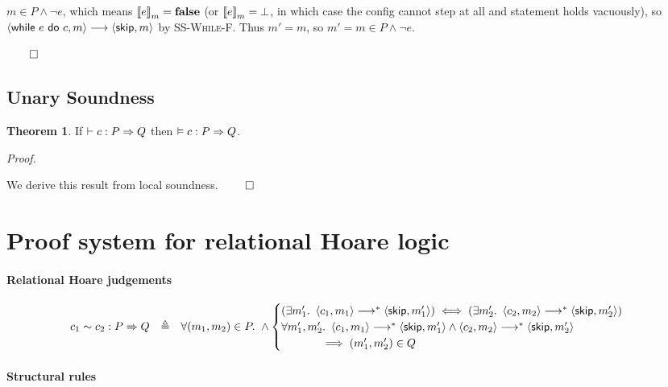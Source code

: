 \documentclass[10pt]{article}
\theoremstyle{definition}
\newtheorem{theorem}{Theorem}
\begin{document}
$m \in P \wedge \neg e$, which means $\Eval(e,m) = \False$
(or $\Eval(e,m) = \bot$, in which case the config cannot step at all and statement holds vacuously),
so $\Cfg(\While e do c,m) \sstepsto \Cfg(\Skip,m)$ by \textsc{SS-While-F}.
Thus $m' = m$, so $m' = m \in P \wedge \neg e$.


\hfill $\qed$

\subsection*{Unary Soundness}
\begin{theorem}
If $\DER \Triple c : P => Q$ then $\VAL \Triple c : P => Q$.
\end{theorem}

\noindent
\emph{Proof.}

\noindent
We derive this result from local soundness.
\hfill $\qed$


\newpage
\section{Proof system for relational Hoare logic}

\paragraph{Relational Hoare judgements}

\begin{displaymath}
\begin{array}{lcl}
    \Quad c_1 ~ c_2 : P => Q
    & \triangleq &
    \forall (m_1,m_2) \in P.\
    \wedge
    \begin{cases}
        (\exists m'_1.\ \Cfg(c_1,m_1) \sstepstotrans \Cfg(\Skip,m'_1))
        \iff
        (\exists m'_2.\ \Cfg(c_2,m_2) \sstepstotrans \Cfg(\Skip,m'_2))
        \\
        \forall m'_1, m'_2.\
        \Cfg(c_1,m_1) \sstepstotrans \Cfg(\Skip,m'_1) \wedge
        \Cfg(c_2,m_2) \sstepstotrans \Cfg(\Skip,m'_2) \\
        \hspace{0.5in} \implies
        (m'_1,m'_2) \in Q
    \end{cases}
\end{array}
\end{displaymath}

\paragraph{Structural rules}
\end{document}
